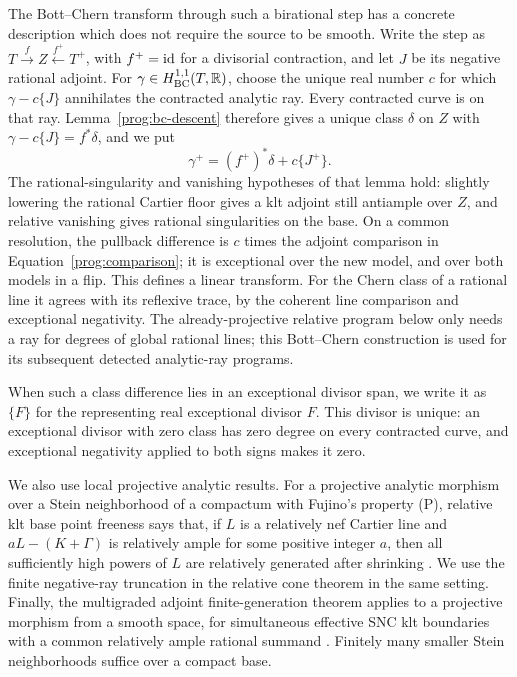 The Bott--Chern transform through such a birational step has a concrete
description which does not require the source to be smooth. Write the
step as \(T\xrightarrow{f}Z\xleftarrow{f^+}T^+\), with
\(f^+=\mathrm{id}\) for a divisorial contraction, and let \(J\) be its
negative rational adjoint. For \(\gamma\in H^{1,1}_{\mathrm{BC}}(T,\mathbb R)\),
choose the unique real number \(c\) for which
\(\gamma-c\{J\}\) annihilates the contracted analytic ray.
Every contracted curve is on that ray. Lemma~\ref{prog:bc-descent}
therefore gives a unique class \(\delta\) on \(Z\) with
\(\gamma-c\{J\}=f^*\delta\), and we put
\[
 \gamma^+=(f^+)^*\delta+c\{J^+\}.
\]
The rational-singularity and vanishing hypotheses of that lemma hold:
slightly lowering the rational Cartier floor gives a klt adjoint still
antiample over \(Z\), and relative vanishing gives rational
singularities on the base. On a common resolution, the pullback
difference is \(c\) times the adjoint comparison in
Equation~\eqref{prog:comparison}; it is exceptional over the new
model, and over both models in a flip. This defines a linear transform.
For the Chern class of a rational line it agrees with its reflexive trace,
by the coherent line comparison \cite[Lemma~7.2]{CB} and exceptional
negativity. The already-projective relative program below only needs a
ray for degrees of global rational lines; this Bott--Chern construction
is used for its subsequent detected analytic-ray programs.

When such a class difference lies in an exceptional divisor span, we write
it as \(\{F\}\) for the representing real exceptional divisor \(F\).
This divisor is unique: an exceptional divisor with zero class has zero
degree on every contracted curve, and exceptional negativity applied to
both signs makes it zero.

We also use local projective analytic results.  For a projective
analytic morphism over a Stein neighborhood of a compactum with
Fujino's property (P), relative klt base point freeness says that, if
\(L\) is a relatively nef Cartier line and
\(aL-(K+\Gamma)\) is relatively ample for some positive integer
\(a\), then all sufficiently high powers of \(L\) are relatively
generated after shrinking
\cite[Theorems~6.2 and 6.5]{FujinoAnalyticBCHM}.
We use the finite negative-ray truncation in the relative cone theorem
in the same setting.  Finally, the multigraded adjoint finite-generation
theorem applies to a projective morphism from a smooth space, for simultaneous
effective SNC klt boundaries with a common relatively ample rational
summand \cite[Theorem~3.1]{DHP}.  Finitely many smaller Stein
neighborhoods suffice over a compact base.


